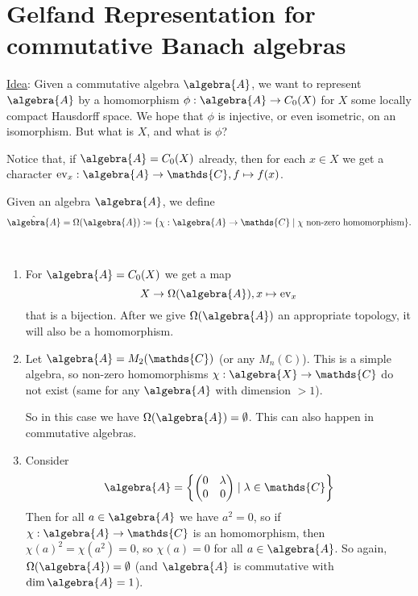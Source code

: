 \documentclass[a4paper]{article}
\begin{document}
\section{Gelfand Representation for commutative Banach algebras}

\underline{Idea}: Given a commutative algebra $\algebra{A}$, we want to represent $\algebra{A}$ by a homomorphism $\phi: \algebra{A} \to C_0(X)$ for $X$ some locally compact Hausdorff space. We hope that $\phi$ is injective, or even isometric, on an isomorphism. But what is $X$, and what is $\phi$?

Notice that, if $\algebra{A} = C_0(X)$ already, then for each $x \in X$ we get a character $\mathrm{ev}_x: \algebra{A} \to \mathds{C}, f \mapsto f(x)$.

\begin{definition}
	Given an algebra $\algebra{A}$, we define 
	\begin{equation*}
		\hat{\algebra{A}} = \Omega(\algebra{A}) \coloneq \{\chi: \algebra{A} \to \mathds{C} \mid \chi \text{ non-zero homomorphism}\}\text{.}
	\end{equation*}
\end{definition}

\begin{example}~
	\begin{enumerate}
		\item For $\algebra{A} = C_0(X)$ we get a map
		\begin{equation*}
			X \to \Omega(\algebra{A}), x \mapsto \mathrm{ev}_x
		\end{equation*}
		that is a bijection. After we give $\Omega(\algebra{A})$ an appropriate topology, it will also be a homomorphism.
		\item Let $\algebra{A} = M_2(\mathds{C})$ (or any $M_n(\mathds{C})$). This is a simple algebra, so non-zero homomorphisms $\chi: \algebra{X} \to \mathds{C}$ do not exist (same for any $\algebra{A}$ with dimension $>1$).
		
		So in this case we have $\Omega(\algebra{A}) = \emptyset$. This can also happen in commutative algebras. 
		\item Consider
		\begin{equation*}
			\algebra{A} = \left\{ \qmatrix{0 & \lambda \\ 0 & 0} \mid \lambda \in \mathds{C}  \right\}
		\end{equation*}
		Then for all $a \in \algebra{A}$ we have $a^2 = 0$, so if $\chi: \algebra{A} \to \mathds{C}$ is an homomorphism, then $\chi(a)^2 = \chi(a^2) = 0$, so $\chi(a) = 0$ for all $a \in \algebra{A}$.
		So again, $\Omega(\algebra{A}) = \emptyset$ (and $\algebra{A}$ is commutative with $\dim \algebra{A} = 1$).
	\end{enumerate}
\end{example}
\end{document}
